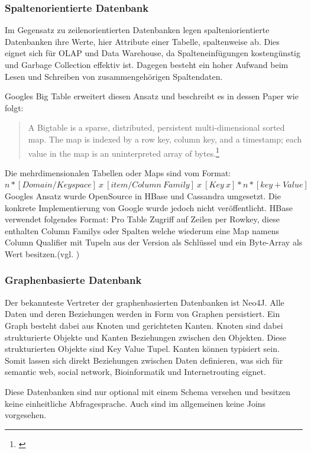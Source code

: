 \subsubsection{Spaltenorientierte Datenbank}

Im Gegensatz zu zeilenorientierten Datenbanken legen spalteniorientierte Datenbanken ihre Werte, hier Attribute einer Tabelle, spaltenweise ab.
Dies eignet sich für OLAP und Data Warehouse, da Spalteneinfügungen kostengünstig und Garbage Collection effektiv ist.
Dagegen besteht ein hoher Aufwand beim Lesen und Schreiben von zusammengehörigen Spaltendaten.

Googles Big Table erweitert diesen Ansatz und beschreibt es in dessen Paper wie folgt:
\begin{quote}
A  Bigtable  is  a  sparse,  distributed,  persistent  multi-dimensional sorted map. The map is indexed by a row key, column key, and a timestamp; each value in the map is an uninterpreted array of bytes.\footnote{\cite[S.1]{paper:bigtable}}
\end{quote}
Die mehrdimensionalen Tabellen oder Maps sind vom Format:\\
$n*[Domain / Keyspace]\ x\ [item / Column\ Family]\ x\ [Key\ x]*n*[key+Value]$
Googles Ansatz wurde OpenSource in HBase und Cassandra umgesetzt. Die konkrete Implementierung von Google wurde jedoch nicht veröffentlicht.
HBase verwendet folgendes Format: Pro Table Zugriff auf Zeilen per Rowkey, diese enthalten Column Familys oder Spalten welche wiederum eine Map namens Column Qualifier mit Tupeln aus der Version als Schlüssel und ein Byte-Array als Wert besitzen.(vgl. \cite[S.13]{ba:dan})

\subsubsection{Graphenbasierte Datenbank}

Der bekannteste Vertreter der graphenbasierten Datenbanken ist Neo4J.
Alle Daten und deren Beziehungen werden in Form von Graphen persistiert.
Ein Graph besteht dabei aus Knoten und gerichteten Kanten.
Knoten sind dabei strukturierte Objekte und Kanten Beziehungen zwischen den Objekten.
Diese strukturierten Objekte sind Key Value Tupel.
Kanten können typisiert sein.
Somit lassen sich direkt Beziehungen zwischen Daten definieren, was sich für semantic web, social network, Bioinformatik und Internetrouting eignet.

Diese Datenbanken sind nur optional mit einem Schema versehen und besitzen keine einheitliche Abfragesprache.
Auch sind im allgemeinen keine Joins vorgesehen.


